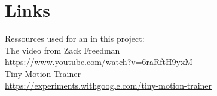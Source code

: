 \documentclass[a4paper,titlepage]{article}
\begin{document}
\newpage
\section{Links}

Ressources used for an in this project: \\

The video from Zack Freedman \\
\href{https://www.youtube.com/watch?v=6raRftH9yxM}{https://www.youtube.com/watch?v=6raRftH9yxM} \\

Tiny Motion Trainer \\
\href{https://experiments.withgoogle.com/tiny-motion-trainer}{https://experiments.withgoogle.com/tiny-motion-trainer} \\
\end{document}

